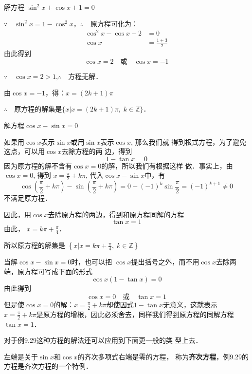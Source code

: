 \begin{example}
    解方程 $\sin^2 x+\cos x+1=0$
\end{example}

\begin{solution}
$\because\quad \sin^2 x=1-\cos^2x$，\qquad $\therefore\quad $原方程可化为：
\[\begin{split}
    \cos^2x-\cos x-2&=0\\
    \cos x&=\frac{1\pm 3}{2}
\end{split}\]
由此得到
\[\cos x=2\quad \text{或}\quad \cos x=-1\]

$\because\quad \cos x=2>1$,\qquad  $\therefore\quad $方程无解．

由$ \cos x=-1$，得：$x=(2k+1)\pi$

$\therefore\quad $原方程的解集是$\{x|x=(2k+1)\pi,\; k\in\mathbb{Z}\}$．
\end{solution}

\begin{example}
    解方程$\cos x-\sin x=0$
\end{example}

\begin{solution}
    如果用$\cos x$表示$\sin x$或用$\sin x$表示$\cos x$, 那么我们就
    得到根式方程，为了避免这点，可以用$\cos x$去除方程的两
    边，得到
    \[1-\tan x=0\]
    因为原方程的解不含有$\cos x=0$的解，所以我们有根据这样
    做．事实上，由$\cos x=0$, 得到
    $x=\frac{\pi}{2}+k\pi$, 代入$\cos x-\sin x$中，有
   \[ \cos\left(\frac{\pi}{2}+k\pi \right)-\sin\left(\frac{\pi}{2}+k\pi \right)=0-(-1)^k\sin \frac{\pi}{2}=(-1)^{k+1}\ne 0\]
    不满足原方程．
    
    因此，用$\cos x$去除原方程的两边，得到和原方程同解的方程
    \[\tan x=1\]
    由此，
   $ x=k\pi +\frac{\pi}{4}$．

   所以原方程的解集是
$\left\{x\Big|x=k\pi+\frac{\pi}{4},\; k\in\mathbb{Z}\right\}$
\end{solution}

\begin{rmk}
当解$\cos x-\sin x=0$时，也可以把
$\cos x$提出括号之外，而不用$\cos x$去除两端，原方程可写成下面的形式
$$\cos x (1-\tan x)=0$$
由此得到
$$\cos x=0\quad \text{或}\quad \tan x=1$$
但是使$\cos x=0$的解：$x=\frac{\pi}{2}+k\pi$却使因式$1-\tan x$无意义，这就表示$x=\frac{\pi}{2}+k\pi$是原方程的增根，因此必须舍去，同样我们得到原方程的同解方程
$\tan x=1$．

对于例9.29这种方程的解法还可以应用到下面更一般的类
型上去．

左端是关于$\sin x$和$\cos x$的齐次多项式右端是零的方程，
称为\textbf{齐次方程}，例9.29的方程是齐次方程的一个特例．
\end{rmk}




